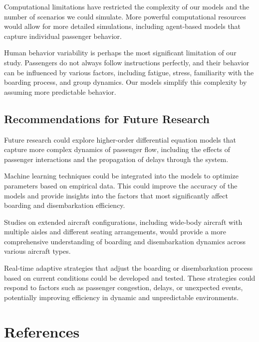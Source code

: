 Computational limitations have restricted the complexity of our models and the number of scenarios we could simulate. More powerful computational resources would allow for more detailed simulations, including agent-based models that capture individual passenger behavior.

Human behavior variability is perhaps the most significant limitation of our study. Passengers do not always follow instructions perfectly, and their behavior can be influenced by various factors, including fatigue, stress, familiarity with the boarding process, and group dynamics. Our models simplify this complexity by assuming more predictable behavior.

\subsection{Recommendations for Future Research}

Future research could explore higher-order differential equation models that capture more complex dynamics of passenger flow, including the effects of passenger interactions and the propagation of delays through the system.

Machine learning techniques could be integrated into the models to optimize parameters based on empirical data. This could improve the accuracy of the models and provide insights into the factors that most significantly affect boarding and disembarkation efficiency.

Studies on extended aircraft configurations, including wide-body aircraft with multiple aisles and different seating arrangements, would provide a more comprehensive understanding of boarding and disembarkation dynamics across various aircraft types.

Real-time adaptive strategies that adjust the boarding or disembarkation process based on current conditions could be developed and tested. These strategies could respond to factors such as passenger congestion, delays, or unexpected events, potentially improving efficiency in dynamic and unpredictable environments.

\section{References}

